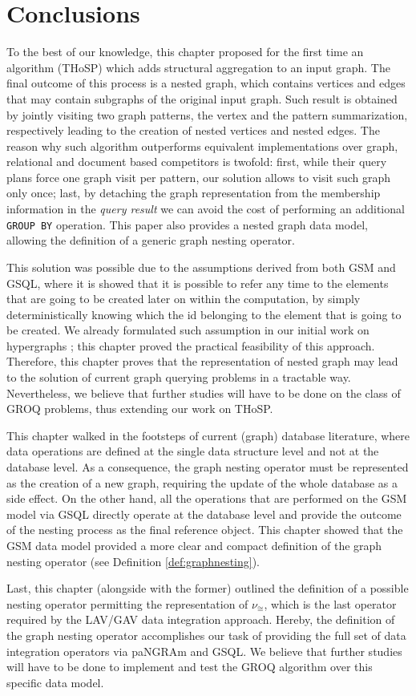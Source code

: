 \section{Conclusions}

To the best of our knowledge, this chapter proposed for the first time an algorithm (THoSP) which adds structural aggregation to an input graph. The final outcome of this process is a nested graph, which contains vertices and edges that may contain subgraphs of the original input graph. Such result is obtained by jointly visiting two graph patterns, the vertex and the pattern summarization, respectively leading to the creation of nested vertices and nested edges. The reason why such algorithm outperforms equivalent implementations over graph, relational and document based competitors is twofold: first, while their query plans force one graph visit per pattern, our solution allows to visit such graph only once; last, by detaching the graph representation from the membership information in the \textit{query result} we can avoid the cost of performing an additional \texttt{GROUP BY} operation. This paper also provides a nested graph data model, allowing the definition of a generic graph nesting operator.

This solution was possible due to the assumptions derived from both GSM and GSQL, where it is showed that it is possible to refer any time to the elements that are going to be created later on within the computation, by simply deterministically knowing which the id belonging to the element that is going to be created. We already formulated such  assumption in our initial work on hypergraphs \cite{bergami2014}; this chapter proved the practical feasibility of this approach. Therefore, this chapter proves that the representation of nested graph may lead to the solution of current graph querying problems in a tractable way. Nevertheless, we believe that further studies will have to be done on the class of  GROQ problems, thus extending our work on THoSP.

This chapter walked in the footsteps of current (graph) database literature, where data operations are defined  at the single data structure level and not at the database level. As a consequence, the graph nesting operator must be represented as the creation of a new graph, requiring the update of the whole database as a side effect. On the other hand, all the operations that are performed on the GSM model via GSQL directly operate at the database level and provide the outcome of the nesting process as the final reference object. This chapter showed that the GSM data model provided a more clear and compact definition of the graph nesting operator (see Definition \vref{def:graphnesting}).

Last, this chapter (alongside with the former) outlined the definition of a possible nesting operator permitting the representation of $\nu_\cong$, which is the last operator required by the LAV/GAV data integration approach. Hereby, the definition of the graph nesting operator accomplishes our task of providing the full set of data integration operators via paNGRAm and GSQL. We believe that further studies will have to be done to implement and test the GROQ algorithm over this specific data model.